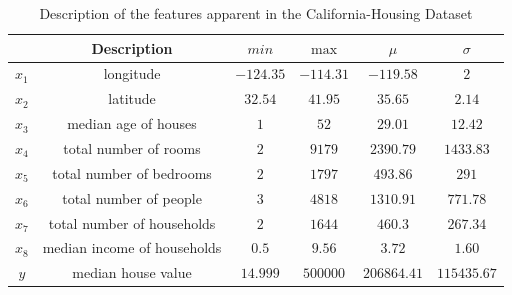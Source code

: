 \documentclass{article} %
\begin{document}
\begin{table}
  \caption{Description of the features apparent in the California-Housing Dataset}
  \label{tab:features-description}
  \centering
  \begin{tabular}{ c|c|c|c|c|c| }
    \hline
    & Description & \(min\) & \(\max\) & \(\mu\) & \(\sigma\) \\
    \hline
    \(x_1\) & longitude & \(-124.35\) & \(-114.31\) & \(-119.58\) & \(2\) \\
    \(x_2\) & latitude  & \(32.54\) & \(41.95\) & \(35.65\) & \(2.14\) \\
    \(x_3\) & median age of houses & \(1\) & \(52\) & \(29.01\) & \(12.42\) \\
    \(x_4\) & total number of rooms & \(2\) & \(9179\) & \(2390.79\) & \(1433.83\) \\
    \(x_5\) & total number of bedrooms & \(2\) & \(1797\) & \(493.86\) & \(291\) \\
    \(x_6\) & total number of people & \(3\) & \(4818\) & \(1310.91\) & \(771.78\) \\
    \(x_7\) & total number of households & \(2\) & \(1644\) & \(460.3\) & \(267.34\) \\
    \(x_8\) & median income of households & \(0.5\) & \(9.56\) & \(3.72\) & \(1.60\) \\
    \hline
    \(y\) & median house value & \(14.999\) & \(500000\) & \(206864.41\) & \(115435.67\) \\
    \hline
  \end{tabular}
\end{table}
\end{document}
